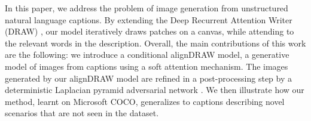 \documentclass{article} %
\newcommand{\comm}[1]{}
\begin{document}
In this paper, we address the problem of image generation from unstructured natural language captions. By extending the Deep Recurrent Attention Writer (DRAW) \cite{gregor_draw}, our model iteratively draws patches on a canvas, while attending to the relevant words in the description. Overall, the main contributions of this work are the following: we introduce a conditional alignDRAW model, a generative model of images from captions using a soft attention mechanism. The images generated by our alignDRAW model are refined in a post-processing step by a deterministic Laplacian pyramid adversarial network \cite{denton_lapgan}. We then illustrate how our method, learnt on Microsoft COCO, generalizes to captions describing novel scenarios that are not seen in the dataset. 

\comm{to the best of our knowledge this paper is the first to introduce the generative model of images conditioned on captions.}

\comm{There are two directions in learning a generative model of image and text.  One approach is to learn a text generative model conditioned on the images.} 
\comm{The models take an image descriptor and generate unstructured texts through a recurrent decoder.} 

\comm{Namely, the model has to capture the semantic meaning expressed in the description and then use that knowledge to generate pixel intensities of the image. Although, the interesting high dimensional natural images lay on a small manifold that is difficult to capture, the additional text description cues of a target image may simplify the learning problem by focusing on the conditional distribution. }
\end{document}
